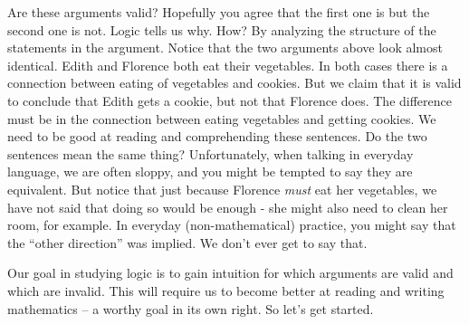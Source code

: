 \documentclass[12pt]{article}
\begin{document}
Are these arguments valid?  Hopefully you agree that the first one is but the second one is not.  Logic tells us why.  How?  By analyzing the structure of the statements in the argument.  Notice that the two arguments above look almost identical.  Edith and Florence both eat their vegetables.  In both cases there is a connection between eating of vegetables and cookies.  But we claim that it is valid to conclude that Edith gets a cookie, but not that Florence does.  The difference must be in the connection between eating vegetables and getting cookies.  We need to be good at reading and comprehending these sentences.  Do the two sentences mean the same thing?  Unfortunately, when talking in everyday language, we are often sloppy, and you might be tempted to say they are equivalent.  But notice that just because Florence {\em must} eat her vegetables, we have not said that doing so would be enough - she might also need to clean her room, for example.  In everyday (non-mathematical) practice, you might 
say that the ``other direction'' was implied.  We don't ever get to say that.

Our goal in studying logic is to gain intuition for which arguments are valid and which are invalid.  This will require us to become better at reading and writing mathematics -- a worthy goal in its own right.  So let's get started.
\end{document}
